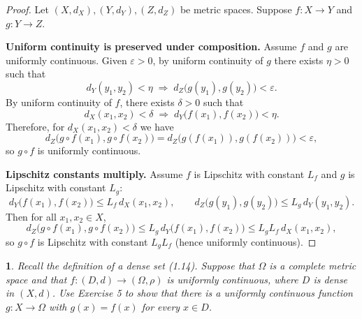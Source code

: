 \documentclass[12pt, a4paper]{report}
\theoremstyle{spaced}
\newtheorem{exercise}{}
\newcommand{\setexercise}[1]{\setcounter{exercise}{#1-1}}
\begin{document}
\begin{proof}
	Let $(X,d_X),(Y,d_Y),(Z,d_Z)$ be metric spaces.
	Suppose $f:X\to Y$ and $g:Y\to Z$.

	\medskip
	\noindent\textbf{Uniform continuity is preserved under composition.}
	Assume $f$ and $g$ are uniformly continuous.
	Given $\varepsilon>0$, by uniform continuity of $g$ there exists $\eta>0$ such that
	\[
		d_Y(y_1,y_2)<\eta \;\Longrightarrow\; d_Z\bigl(g(y_1),g(y_2)\bigr)<\varepsilon.
	\]
	By uniform continuity of $f$, there exists $\delta>0$ such that
	\[
		d_X(x_1,x_2)<\delta \;\Longrightarrow\; d_Y\bigl(f(x_1),f(x_2)\bigr)<\eta.
	\]
	Therefore, for $d_X(x_1,x_2)<\delta$ we have
	\[
		d_Z\bigl(g\!\circ f(x_1),g\!\circ f(x_2)\bigr)
		= d_Z\bigl(g(f(x_1)),g(f(x_2))\bigr) < \varepsilon,
	\]
	so $g\circ f$ is uniformly continuous.

	\medskip
	\noindent\textbf{Lipschitz constants multiply.}
	Assume $f$ is Lipschitz with constant $L_f$ and $g$ is Lipschitz with constant $L_g$:
	\[
		d_Y\bigl(f(x_1),f(x_2)\bigr)\le L_f\,d_X(x_1,x_2),\qquad
		d_Z\bigl(g(y_1),g(y_2)\bigr)\le L_g\,d_Y(y_1,y_2).
	\]
	Then for all $x_1,x_2\in X$,
	\[
		d_Z\bigl(g\!\circ f(x_1),g\!\circ f(x_2)\bigr)
		\le L_g\,d_Y\bigl(f(x_1),f(x_2)\bigr)
		\le L_g L_f\, d_X(x_1,x_2),
	\]
	so $g\circ f$ is Lipschitz with constant $L_gL_f$ (hence uniformly continuous).
\end{proof}

\setexercise{6}
\begin{exercise}
	Recall the definition of a dense set (1.14). Suppose that $\Omega$ is a complete metric space
	and that $f : (D, d) \to (\Omega, \rho)$ is uniformly continuous, where $D$ is dense in $(X, d)$.
	Use Exercise 5 to show that there is a uniformly continuous function
	$g : X \to \Omega$ with $g(x) = f(x)$ for every $x \in D$.
\end{exercise}
\end{document}
